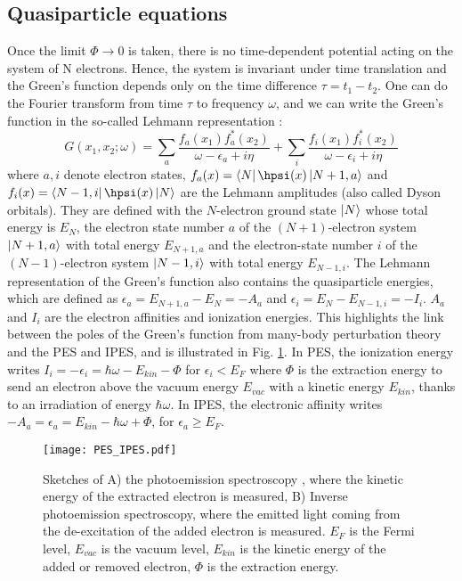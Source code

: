 %
\subsection{Quasiparticle equations}
Once the limit $\Phi \to 0$ is taken, there is no time-dependent potential acting on the system of N electrons. Hence, the system is invariant under time translation and the Green's function depends only on the time difference $\tau = t_1 - t_2$. One can do the Fourier transform from time $\tau$ to frequency $\omega$, and we can write the Green's function in the so-called Lehmann representation :
\begin{equation}
	G(x_1,x_2;\omega) = \sum_a \frac{f_a(x_1)f_a^*(x_2)}{\omega-\epsilon_a + i\eta} + \sum_i \frac{f_i(x_1)f_i^*(x_2)}{\omega-\epsilon_i + i\eta}
\end{equation}
where $a,i$ denote electron states, $f_a(x) = \bra{N}\hpsi(x)\ket{N+1,a}$ and \\ $f_i(x) = \bra{N-1,i} \hpsi(x) \ket{N}$ are the Lehmann amplitudes (also called Dyson orbitals). They are defined with the $N$-electron ground state $\ket{N}$ whose total energy is $E_N$, the electron state number $a$ of the $(N+1)$-electron system $\ket{N+1,a}$ with total energy $E_{N+1,a}$ and the electron-state number $i$ of the $(N-1)$-electron system $\ket{N-1,i}$ with total energy $E_{N-1,i}$.
The Lehmann representation of the Green's function also contains the quasiparticle energies, which are defined as $\epsilon_a = E_{N+1,a} - E_N = -A_a$ and $\epsilon_i = E_N - E_{N-1,i} = -I_i$. $A_a$ and $I_i$ are the electron affinities and ionization energies. This highlights the link between the poles of the Green's function from many-body perturbation theory and the \acrfull{PES} and \acrfull{IPES}, and is illustrated in Fig. \ref{fig:sketch_PES}. In \acrshort{PES}, the ionization energy writes $I_i = -\epsilon_i = \hbar \omega - E_{kin} - \Phi$ for $\epsilon_i < E_F$ where $\Phi$ is the extraction energy to send an electron above the vacuum energy $E_{vac}$ with a kinetic energy $E_{kin}$, thanks to an irradiation of energy $\hbar \omega$. In \acrshort{IPES}, the electronic affinity writes $-A_a = \epsilon_a = E_{kin} - \hbar \omega + \Phi$, for $\epsilon_a \geq E_F$.
\begin{figure}[tbp]
	\setcapindent{2em}
	\centering
	\texttt{[image: PES\_IPES.pdf]}
	\caption{Sketches of A) the photoemission spectroscopy , where the kinetic energy of the extracted electron is measured, B) Inverse photoemission spectroscopy, where the emitted light coming from the de-excitation of the added electron is measured. $E_F$ is the Fermi level, $E_{vac}$ is the vacuum level, $E_{kin}$ is the kinetic energy of the added or removed electron, $\Phi$ is the extraction energy. }
	\label{fig:sketch_PES}
\end{figure}


